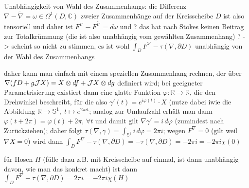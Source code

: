 \documentclass[../H_Analysis_main.tex]{subfiles}
\begin{document}
Unabhängigkeit von Wahl des Zusammenhangs: die Differenz $\nabla - \tilde{\nabla} = \omega \in \Omega^1(D, \mathbb{C})$ zweier Zusammenhänge auf der Kreisscheibe $D$ ist also tensoriell und daher ist $F^\nabla - F^{\tilde{\nabla}} = d\omega$ und ? das hat nach Stokes keinen Beitrag zur Totalkrümmung (die ist also unabhängig vom gewählten Zusammenhang) ? -> scheint so nicht zu stimmen, es ist wohl $\int_D F^\nabla - \tau(\nabla, \partial D)$ unabhängig von der Wahl des Zusammenhangs

daher kann man einfach mit einem speziellen Zusammenhang rechnen, der über $\nabla\qty(f D + g \mathcal{J} X) = X \otimes df + \mathcal{J}X \otimes dg$ definiert wird; bei geeigneter Parametrisierung existiert dann eine glatte Funktion $\varphi: \mathbb{R} \rightarrow \mathbb{R}$, die den Drehwinkel beschreibt, für die also $\gamma'(t) = e^{i \varphi(t)} \cdot X$ (nutze dabei iwie die Abbildung $\mathbb{R} \rightarrow \mathbb{S}^1, \; t \mapsto e^{2 \pi i t}$; analog zur Umlaufzahl erhält man dann $\varphi(t + 2\pi) = \varphi(t) + 2\pi, \, \forall t$ und damit gilt $\nabla \gamma' = i \, d\varphi$ (zumindest nach Zurückziehen); daher folgt $\tau(\nabla, \gamma) = \int_{\mathbb{S}^1} i \, d\varphi = 2\pi i$; wegen $F^\nabla = 0$ (gilt weil $\nabla X = 0$) wird dann $\int_D F^\nabla - \tau(\nabla, \partial D) = - \tau(\nabla, \partial D) = -2\pi i = -2\pi i \chi(0)$

für Hosen $H$ (fülle dazu z.B. mit Kreisscheibe auf einmal, ist dann unabhängig davon, wie man das konkret macht) ist dann $\int_D F^\nabla - \tau(\nabla, \partial D) = 2\pi i = -2\pi i \chi(H)$
\end{document}
